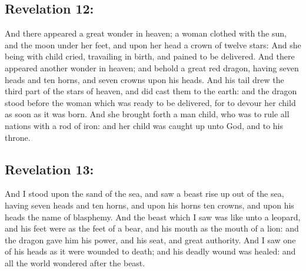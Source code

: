 \subsection{Revelation 12:}
And there appeared a great wonder in heaven; a woman clothed with the sun, and the moon under her feet, and upon her head a crown of twelve stars: And she being with child cried, travailing in birth, and pained to be delivered. And there appeared another wonder in heaven; and behold a great red dragon, having seven heads and ten horns, and seven crowns upon his heads. And his tail drew the third part of the stars of heaven, and did cast them to the earth: and the dragon stood before the woman which was ready to be delivered, for to devour her child as soon as it was born. And she brought forth a man child, who was to rule all nations with a rod of iron: and her child was caught up unto God, and to his throne.

\subsection{Revelation 13:}
And I stood upon the sand of the sea, and saw a beast rise up out of the sea, having seven heads and ten horns, and upon his horns ten crowns, and upon his heads the name of blasphemy. And the beast which I saw was like unto a leopard, and his feet were as the feet of a bear, and his mouth as the mouth of a lion: and the dragon gave him his power, and his seat, and great authority. And I saw one of his heads as it were wounded to death; and his deadly wound was healed: and all the world wondered after the beast.

